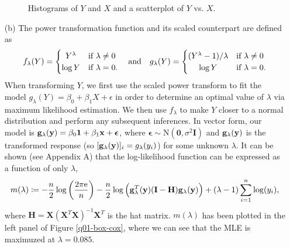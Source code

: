 \documentclass[10pt]{article}
\begin{document}
\begin{itemize}
\begin{figure}[ht]
        \caption{Histograms of \(Y\) and \(X\) and a scatterplot of \(Y\) vs. \(X\).}
        \label{q01-investigation}
    \end{figure}
    \item[(b)] The power transformation function and its scaled counterpart are defined as 
    \begin{align*}
        f_{\lambda}(Y) 
        = \begin{cases}
            \hfil Y^{\lambda} & \text{if } \lambda \neq 0 \\
            \log Y & \text{if } \lambda = 0.
        \end{cases}
        ~~~\text{and}~~~
        g_{\lambda}(Y) 
        = \begin{cases}
            (Y^{\lambda} - 1) / \lambda & \text{if } \lambda \neq 0 \\
            \hfil \log Y & \text{if } \lambda = 0.
        \end{cases}
    \end{align*}
    When transforming \(Y\), we first use the scaled power transform to fit the model \(g_{\lambda}(Y) = \beta_0 + \beta_1 X + \epsilon\) in order
    to determine an optimal value of \(\lambda\) via maximum likelihood estimation. 
    We then use \(f_{\lambda}\) to make \(Y\) closer to a normal distribution and perform any subsequent inferences. 
    In vector form, our model is \(\mathbf{g}_{\lambda}(\mathbf{y}) = \beta_0 \mathbf{1} + \beta_1 \mathbf{x} + \bm{\epsilon}\), where \(\bm{\epsilon} \sim \mathrm{N}(\mathbf{0}, \sigma^2 \mathbf{I})\)
    and \(\mathbf{g}_{\lambda}(\mathbf{y})\) is the transformed response (so \([\mathbf{g}_{\lambda}(\mathbf{y})]_i = g_{\lambda}(y_i)\)) for some unknown \(\lambda\). 
    It can be shown (see Appendix A) that the log-likelihood function can be expressed as a function of only \(\lambda\), 
    \begin{align*}
        m(\lambda)
        \coloneqq - \frac{n}{2} \log \left( \frac{2 \pi \mathrm{e}}{n} \right) - \frac{n}{2} \log \Big( \mathbf{g}_{\lambda}^T(\mathbf{y})(\mathbf{I} - \mathbf{H}) \mathbf{g}_{\lambda}(\mathbf{y}) \Big) + (\lambda - 1) \sum_{i=1}^n \log(y_i),
    \end{align*}
    where \(\mathbf{H} = \mathbf{X}(\mathbf{X}^T\mathbf{X})^{-1}\mathbf{X}^T\) is the hat matrix. \(m(\lambda)\) has been plotted in the left panel of Figure \ref{q01-box-cox},
    where we can see that the MLE is maximuzed at \(\lambda = 0.085\). 


\end{itemize}
\end{document}
